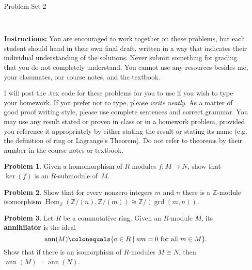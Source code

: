 \documentclass[11pt]{article}
\title{}
\date{\vspace{-0.5in}}
\newcommand{\Z}{\mathbb{Z}}
\DeclareMathOperator{\Hom}{Hom}
\DeclareMathOperator{\ann}{ann}
\theoremstyle{definition}
\newtheorem{problem}{Problem}
\begin{document}
\thispagestyle{fancy}
\pagestyle{fancy}

\vspace{3em}

\begin{center}
	{\LARGE Problem Set 2}
\end{center}

\

\noindent
{\bf Instructions:}
You are encouraged to work together on these problems, but each student should hand in their own final draft, written in a way that indicates their individual understanding of the solutions. Never submit something for grading that you do not completely understand. You cannot use any resources besides me, your classmates, our course notes, and the textbook.


I will post the .tex code for these problems for you to use if you wish to type your homework. If you prefer not to type, please  {\em write neatly}. As a matter of good proof writing style, please use complete sentences and correct grammar. You may use any result  stated or proven in class or in a homework problem, provided you reference it appropriately by either stating the result or stating its name (e.g. the definition of ring or Lagrange's Theorem). Do not refer to theorems by their number in the course notes or textbook.


\vspace{2em}





\begin{problem}
	Given a homomorphism of $R$-modules $f\!: M \to N$, show that $\ker(f)$ is an $R$-submodule of~$M$.
\end{problem}


\begin{problem}
	Show that for every nonzero integers $m$ and $n$ there is a $\Z$-module isomorphism $\Hom_\Z(\Z/(n),\Z/(m)) \cong \Z / (\gcd(m,n))$.
\end{problem}


\begin{problem}
Let $R$ be a commutative ring. Given an $R$-module $M$, its {\bf annihilator} is the ideal 
$$\ann(M) \colonequals \{ a \in R \mid am = 0 \textrm{ for all } m \in M \}.$$
Show that if there is an isomorphism of $R$-modules $M \cong N$, then $\ann(M) = \ann(N)$.
\end{problem}
\end{document}
